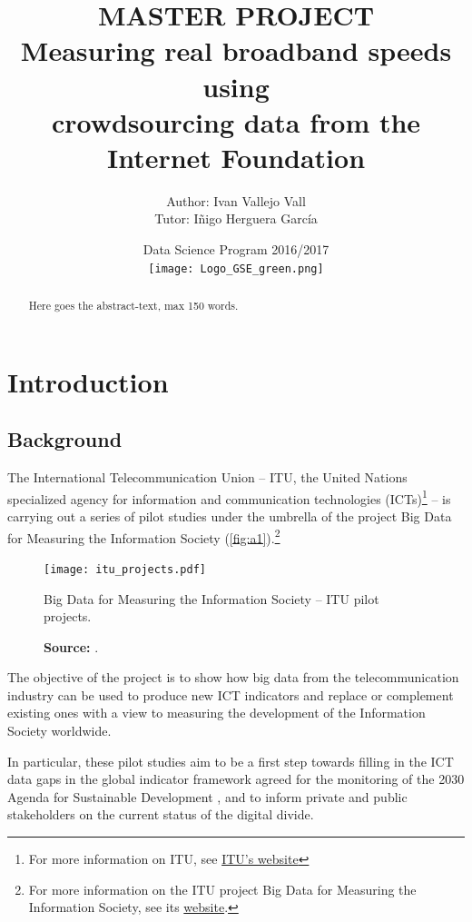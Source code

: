 \documentclass[12pt]{article}
\author{Author: Ivan Vallejo Vall \\ Tutor: Iñigo Herguera García}
\title{%
  \vspace{-0.0cm}MASTER PROJECT \\ 
  \vspace{1cm} Measuring real broadband speeds using \\ crowdsourcing data from the Internet Foundation \\ \vspace{2cm} 
  }
\date{\vspace{1cm} Data Science Program 2016/2017 \\ 
\vspace{2cm} \texttt{[image: Logo\_GSE\_green.png]}}
\begin{document}
\linespread{1.4}\selectfont
{}%
\maketitle
\newpage
\begin{abstract}
   Here goes the abstract-text, max 150 words.
\end{abstract}
\newpage
\tableofcontents
\newpage
\listoffigures
\listoftables
\newpage
{}%
\section{Introduction}
\subsection{Background}
The International Telecommunication Union -- ITU, the United Nations specialized agency for information and communication technologies (ICTs)\footnote{For more information on ITU, see \href{http://www.itu.int/en/about/Pages/default.aspx}{ITU's website}} -- is carrying out a series of pilot studies under the umbrella of the project Big Data for Measuring the Information Society (\autoref{fig:a1}).\footnote{For more information on the ITU project Big Data for Measuring the Information Society, see its \href{http://www.itu.int/en/ITU-D/Statistics/Pages/bigdata/default.aspx}{website}.} 
\vspace{1cm}
\begin{figure}[H]
    \centering
        \texttt{[image: itu\_projects.pdf]}
        \caption{Big Data for Measuring the Information Society -- ITU pilot projects.}
        \caption*{\textbf{Source:} \cite{margus}.}
        \label{fig:a1}
\end{figure}   


The objective of the project is to show how big data from the telecommunication industry can be used to produce new ICT indicators and replace or complement existing ones with a view to measuring the development of the Information Society worldwide. 

In particular, these pilot studies aim to be a first step towards filling in the ICT data gaps in the global indicator framework agreed for the monitoring of the 2030 Agenda for Sustainable Development \citep{interagency}, and to inform private and public stakeholders on the current status of the digital divide.      
\end{document}
